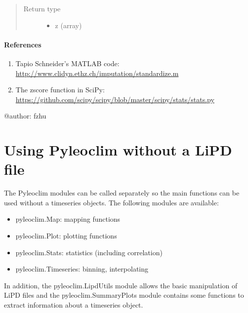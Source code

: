 \documentclass[letterpaper,10pt,english]{sphinxmanual}
\begin{document}
\begin{fulllineitems}
\begin{quote}
\begin{description}
\begin{itemize}
\end{itemize}


\item[{Return type}] \leavevmode
\begin{itemize}
\item {} 
z (array)

\end{itemize}


\end{description}\end{quote}
\paragraph{References}
\begin{enumerate}
\item {} 
Tapio Schneider's MATLAB code: \url{http://www.clidyn.ethz.ch/imputation/standardize.m}

\item {} 
The zscore function in SciPy: \url{https://github.com/scipy/scipy/blob/master/scipy/stats/stats.py}

\end{enumerate}

@author: fzhu

\end{fulllineitems}



\section{Using Pyleoclim without a LiPD file}
\label{\detokenize{Main:using-pyleoclim-without-a-lipd-file}}
The Pyleoclim modules can be called separately so the main functions can be used without a timeseries objects.
The following modules are available:
\begin{itemize}
\item {} 
pyleoclim.Map: mapping functions

\item {} 
pyleoclim.Plot: plotting functions

\item {} 
pyleoclim.Stats: statistics (including correlation)

\item {} 
pyleoclim.Timeseries: binning, interpolating

\end{itemize}

In addition, the pyleoclim.LipdUtils module allows the basic manipulation of LiPD files and the pyleoclim.SummaryPlots module
contains some functions to extract information about a timeseries object.
\end{document}
